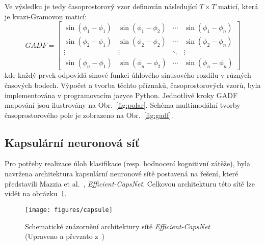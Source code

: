 Ve výsledku je tedy časoprostorový vzor definován následující $T \times T$
maticí, která je kvazi-Gramovou maticí:
\begin{equation}
    GADF = \left[\begin{array}{cccc}
            \sin \left(\phi_1-\phi_1\right) & \sin \left(\phi_1-\phi_2\right) & \cdots & \sin \left(\phi_1-\phi_n\right) \\
            \sin \left(\phi_2-\phi_1\right) & \sin \left(\phi_2-\phi_2\right) & \cdots & \sin \left(\phi_2-\phi_n\right) \\
            \vdots                          & \vdots                          & \ddots & \vdots                          \\
            \sin \left(\phi_n-\phi_1\right) & \sin \left(\phi_n-\phi_2\right) & \cdots & \sin \left(\phi_n-\phi_n\right)
        \end{array}\right]
\end{equation}
kde každý prvek odpovídá sinové funkci úhlového sinusového rozdílu v různých
časových bodech. Výpočet a tvorba těchto příznaků, časoprostorových vzorů, byla
implementována v programovacím jazyce Python. Jednotlivé kroky \gls{GADF}
mapování jsou ilustrovány na Obr.~\ref{fig:polar}. Schéma multimodální tvorby
časoprostorového pole je zobrazeno na Obr.~\ref{fig:gadf}.

\subsection{Kapsulární neuronová síť}
\label{subsec:kapsularni_sit}
Pro potřeby realizace úloh klasifikace (resp. hodnocení kognitivní zátěže), byla
navržena architektura kapsulární neuronové sítě postavená na řešení, které
představili Mazzia et al.~\cite{Mazzia2021}, \textit{Efficient-CapsNet}.
Celkovou architekturu této sítě lze vidět na obrázku~\ref{fig:architektura}.

\begin{figure}[!htb]
    \begin{center}
        \texttt{[image: figures/capsule]}
        \caption{Schematické znázornění architektury sítě
            \textit{Efficient-CapsNet} (Upraveno a převzato z~\cite{Zhou2021})}
        \label{fig:architektura}
    \end{center}
\end{figure}

